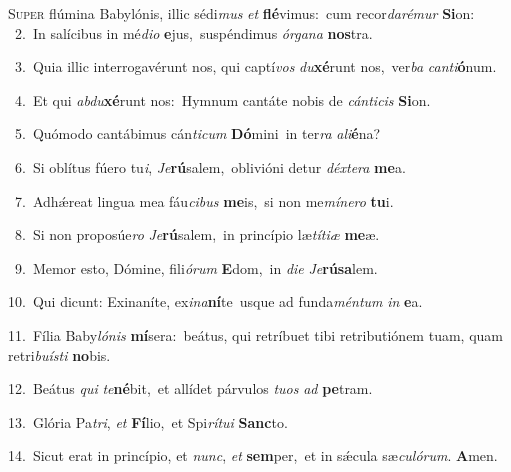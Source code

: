 \lettrine{\initial\textcolor{\initialcolor}{S}}{uper} flúmina Babylónis, illic sédi\textit{mus} \textit{et} \textbf{flé}\-vimus:~\star cum recor\-\textit{da}\-\textit{ré}\textit{mur} \textbf{Si}\-on:\\
{\numbfont\textcolor{\numbcolor}{~2.}}~In salícibus in mé\-\textit{di}\-\textit{o} \textbf{e}\-jus,~\star suspéndimus \textit{ór}\-\textit{ga}\textit{na} \textbf{nos}\-tra.\par
{\numbfont\textcolor{\numbcolor}{~3.}}~Quia illic interrogavérunt nos, qui captí\textit{vos} \textit{du}\-\textbf{xé}runt nos,~\star ver\textit{ba} \textit{can}\-\textit{ti}\textbf{ó}num.\par
{\numbfont\textcolor{\numbcolor}{~4.}}~Et qui \textit{ab}\-\textit{du}\textbf{xé}runt nos:~\star Hymnum cantáte nobis de \textit{cán}\-\textit{ti}\textit{cis} \textbf{Si}\-on.\par
{\numbfont\textcolor{\numbcolor}{~5.}}~Quómodo cantábimus cán\-\textit{ti}\-\textit{cum} \textbf{Dó}\-mini~\star in ter\textit{ra} \textit{a}\-\textit{li}\textbf{é}na?\par
{\numbfont\textcolor{\numbcolor}{~6.}}~Si oblítus fúero tu\-\textit{i}\-, \textit{Je}\-\textbf{rú}salem,~\star oblivióni detur \textit{déx}\-\textit{te}\textit{ra} \textbf{me}\-a.\par
{\numbfont\textcolor{\numbcolor}{~7.}}~Adhǽreat lingua mea fáu\-\textit{ci}\-\textit{bus} \textbf{me}\-is,~\star si non me\-\textit{mí}\-\textit{ne}\textit{ro} \textbf{tu}\-i.\par
{\numbfont\textcolor{\numbcolor}{~8.}}~Si non proposúe\textit{ro} \textit{Je}\-\textbf{rú}salem,~\star in princípio læ\-\textit{tí}\-\textit{ti}\textit{æ} \textbf{me}\-æ.\par
{\numbfont\textcolor{\numbcolor}{~9.}}~Memor esto, Dómine, fili\-\textit{ó}\-\textit{rum} \textbf{E}\-dom,~\star in \textit{di}\-\textit{e} \textit{Je}\-\textbf{rú}\textbf{sa}lem.\par
{\numbfont\textcolor{\numbcolor}{10.}}~Qui dicunt: Exinaníte, ex\-\textit{i}\-\textit{na}\textbf{ní}te~\star usque ad funda\-\textit{mén}\-\textit{tum} \textit{in} \textbf{e}\-a.\par
{\numbfont\textcolor{\numbcolor}{11.}}~Fília Baby\-\textit{ló}\-\textit{nis} \textbf{mí}\-sera:~\star beátus, qui retríbuet tibi retributiónem tuam, quam retri\-\textit{bu}\-\textit{ís}\textit{ti} \textbf{no}\-bis.\par
{\numbfont\textcolor{\numbcolor}{12.}}~Beátus \textit{qui} \textit{te}\-\textbf{né}bit,~\star et allídet párvulos \textit{tu}\-\textit{os} \textit{ad} \textbf{pe}\-tram.\par
{\numbfont\textcolor{\numbcolor}{13.}}~Glória Pa\-\textit{tri}\-, \textit{et} \textbf{Fí}\-lio,~\star et Spi\-\textit{rí}\-\textit{tu}\textit{i} \textbf{Sanc}\-to.\par
{\numbfont\textcolor{\numbcolor}{14.}}~Sicut erat in princípio, et \textit{nunc}\-, \textit{et} \textbf{sem}\-per,~\star et in sǽcula sæ\-\textit{cu}\-\textit{ló}\textit{rum}. \textbf{A}\-men.\par
